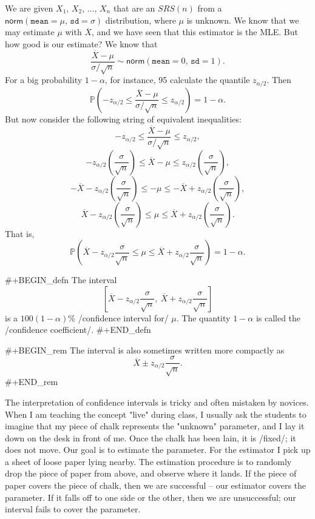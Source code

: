 We are given \(X_{1}\), \(X_{2}\), ..., \(X_{n}\) that are an
\(SRS(n)\) from a
\(\mathsf{norm}(\mathtt{mean}=\mu,\,\mathtt{sd}=\sigma)\)
distribution, where \(\mu\) is unknown. We know that we may estimate
\(\mu\) with \(\overline{X}\), and we have seen that this estimator is
the MLE. But how good is our estimate? We know that
\begin{equation} 
\frac{\overline{X}-\mu}{\sigma/\sqrt{n}}\sim\mathsf{norm}(\mathtt{mean}=0,\,\mathtt{sd}=1).
\end{equation}
For a big probability \(1-\alpha\), for instance, 95%
calculate the quantile \(z_{\alpha/2}\). Then
\begin{equation}
\mathbb{P}\left(-z_{\alpha/2}\leq\frac{\overline{X}-\mu}{\sigma/\sqrt{n}}\leq z_{\alpha/2}\right)=1-\alpha.
\end{equation}
But now consider the following string of equivalent inequalities:
\[
-z_{\alpha/2}\leq\frac{\overline{X}-\mu}{\sigma/\sqrt{n}}\leq z_{\alpha/2},
\]
\[
-z_{\alpha/2}\left(\frac{\sigma}{\sqrt{n}}\right)\leq\overline{X}-\mu\leq z_{\alpha/2}\left(\frac{\sigma}{\sqrt{n}}\right),
\]
\[
-\overline{X} - z_{\alpha/2}\left(\frac{\sigma}{\sqrt{n}}\right)\leq - \mu \leq - \overline{X} + z_{\alpha/2} \left( \frac{\sigma}{\sqrt{n}} \right),
\]
\[
\overline{X} - z_{\alpha/2} \left( \frac{\sigma}{\sqrt{n}} \right) \leq \mu \leq \overline{X} + z_{\alpha/2} \left( \frac{\sigma}{\sqrt{n}} \right).
\]
That is, 
\begin{equation}
\mathbb{P}\left(\overline{X}-z_{\alpha/2}\frac{\sigma}{\sqrt{n}}\leq\mu\leq\overline{X}+z_{\alpha/2}\frac{\sigma}{\sqrt{n}}\right)=1-\alpha.
\end{equation}

#+BEGIN_defn
The interval
\begin{equation}
\left[\overline{X}-z_{\alpha/2}\frac{\sigma}{\sqrt{n}},\ \overline{X}+z_{\alpha/2}\frac{\sigma}{\sqrt{n}}\right]
\end{equation}
is a \(100(1-\alpha)\%\) /confidence interval for/ \(\mu\). The quantity \(1-\alpha\) is called the /confidence coefficient/.
#+END_defn

#+BEGIN_rem
The interval is also sometimes written more compactly as
\begin{equation}
\label{eq-z-interval}
\overline{X}\pm z_{\alpha/2}\frac{\sigma}{\sqrt{n}}.
\end{equation}
#+END_rem

The interpretation of confidence intervals is tricky and often
mistaken by novices. When I am teaching the concept "live" during
class, I usually ask the students to imagine that my piece of chalk
represents the "unknown" parameter, and I lay it down on the desk in
front of me. Once the chalk has been lain, it is /fixed/; it does not
move. Our goal is to estimate the parameter. For the estimator I pick
up a sheet of loose paper lying nearby. The estimation procedure is to
randomly drop the piece of paper from above, and observe where it
lands. If the piece of paper covers the piece of chalk, then we are
successful -- our estimator covers the parameter. If it falls off to
one side or the other, then we are unsuccessful; our interval fails to
cover the parameter.

